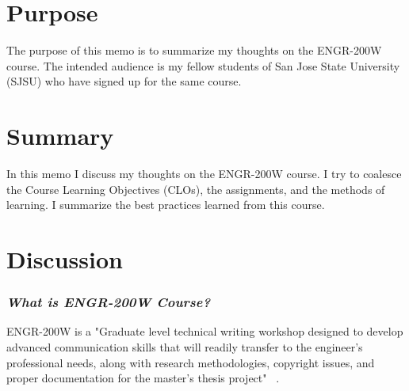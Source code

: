\documentclass[letterpaper,12pt]{texMemo}
\begin{document}
\begin{singlespacing}
\maketitle



\section*{Purpose}
The purpose of this memo is to summarize my thoughts on the ENGR-200W course. The intended audience is my fellow students of San Jose State University (SJSU) who have signed up for the same course.



\section*{Summary}
In this memo I discuss my thoughts on the ENGR-200W course. I try to coalesce the Course Learning Objectives (CLOs), the assignments, and the methods of learning. I summarize the best practices learned from this course.

\section*{Discussion}

\subsubsection*{\textit{What is ENGR-200W Course?}}
ENGR-200W is a "Graduate level technical writing workshop designed to develop advanced communication skills that will readily transfer to the engineer's professional needs, along with research methodologies, copyright issues, and proper documentation for the master's thesis project" ~\citep{Infosjsu77:online}.

\end{singlespacing}
\end{document}
